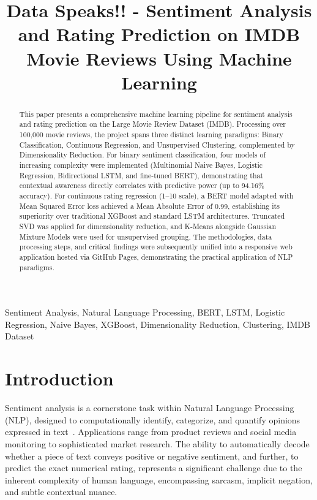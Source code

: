 \documentclass[conference]{IEEEtran}
\begin{document}
\title{Data Speaks!! - Sentiment Analysis and Rating Prediction on IMDB Movie Reviews Using Machine Learning}

\author{
\and
{}
\and
{}
\and
{}
\and
{}
}

\maketitle

\begin{abstract}
This paper presents a comprehensive machine learning pipeline for sentiment analysis and rating prediction on the Large Movie Review Dataset (IMDB). Processing over 100,000 movie reviews, the project spans three distinct learning paradigms: Binary Classification, Continuous Regression, and Unsupervised Clustering, complemented by Dimensionality Reduction. For binary sentiment classification, four models of increasing complexity were implemented (Multinomial Naive Bayes, Logistic Regression, Bidirectional LSTM, and fine-tuned BERT), demonstrating that contextual awareness directly correlates with predictive power (up to 94.16\% accuracy). For continuous rating regression (1--10 scale), a BERT model adapted with Mean Squared Error loss achieved a Mean Absolute Error of 0.99, establishing its superiority over traditional XGBoost and standard LSTM architectures. Truncated SVD was applied for dimensionality reduction, and K-Means alongside Gaussian Mixture Models were used for unsupervised grouping. The methodologies, data processing steps, and critical findings were subsequently unified into a responsive web application hosted via GitHub Pages, demonstrating the practical application of NLP paradigms.
\end{abstract}

\begin{IEEEkeywords}
Sentiment Analysis, Natural Language Processing, BERT, LSTM, Logistic Regression, Naive Bayes, XGBoost, Dimensionality Reduction, Clustering, IMDB Dataset
\end{IEEEkeywords}

\section{Introduction}
Sentiment analysis is a cornerstone task within Natural Language Processing (NLP), designed to computationally identify, categorize, and quantify opinions expressed in text~\cite{b1}. Applications range from product reviews and social media monitoring to sophisticated market research. The ability to automatically decode whether a piece of text conveys positive or negative sentiment, and further, to predict the exact numerical rating, represents a significant challenge due to the inherent complexity of human language, encompassing sarcasm, implicit negation, and subtle contextual nuance.
\end{document}
